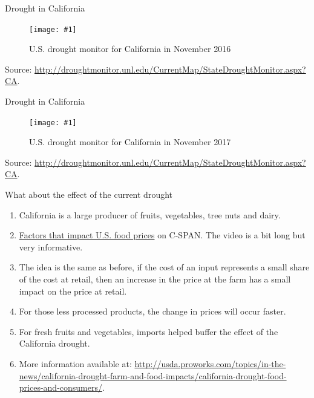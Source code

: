 \documentclass[table,xcolor=pdftex,dvipsnames, handout]{beamer}\usepackage[]{graphicx}\usepackage[]{color}
\newcommand {\framedgraphic}[1] {
        \begin{center}
            \texttt{[image: \#1]}
        \end{center}
        \vspace{-1\baselineskip}
}
\begin{document}

\begin{frame}{Drought in California}
\begin{figure}[htbp]
\caption{U.S. drought monitor for California in November 2016}
    \framedgraphic{drought_California_2016.png}
\end{figure}
\scriptsize
Source: \url{http://droughtmonitor.unl.edu/CurrentMap/StateDroughtMonitor.aspx?CA}.
\end{frame}



\begin{frame}{Drought in California}
\begin{figure}[htbp]
\caption{U.S. drought monitor for California in November 2017}
    \framedgraphic{drought_California_2017.png}
\end{figure}
\scriptsize
Source: \url{http://droughtmonitor.unl.edu/CurrentMap/StateDroughtMonitor.aspx?CA}.
\end{frame}



\begin{frame}{What about the effect of the current drought}
\begin{enumerate}[label=\textbullet]
  \item California is a large producer of fruits, vegetables, tree nuts and dairy.
  \item \href{http://www.c-span.org/video/?318343-5/washington-journal-factors-impact-us-food-prices}{Factors that impact U.S. food prices} on C-SPAN. The video is a bit long but very informative.
  \item The idea is the same as before, if the cost of an input represents a small share of the cost at retail, then an increase in the price at the farm has a small impact on the price at retail.
  \item For those less processed products, the change in prices will occur faster.
  \item For fresh fruits and vegetables, imports helped buffer the effect of the California drought.
  \item More information available at: \url{http://usda.proworks.com/topics/in-the-news/california-drought-farm-and-food-impacts/california-drought-food-prices-and-consumers/}.
\end{enumerate}
\end{frame}
\end{document}
